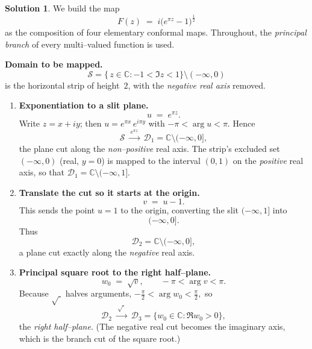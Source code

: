 \documentclass[12pt]{article}
\theoremstyle{definition} %
\newtheorem{solution}{Solution}
\theoremstyle{plain} %
\begin{document}
    \begin{solution}
      We build the map  
      \[
      F(z)\;=\;i\bigl(e^{\pi z}-1\bigr)^{\tfrac12}
      \]
      as the composition of four elementary conformal maps.  Throughout,
      the \emph{principal branch} of every multi–valued function is used.
      
      \medskip
      \textbf{Domain to be mapped.}
      \[
      \boxed{
         \mathcal S
         =\bigl\{\,z\in\mathbb{C} : -1<\Im z<1\bigr\}
          \setminus (-\infty,0)
       }
      \]
      is the horizontal strip of height~$2$, with the \emph{negative real
      axis} removed.
      
      \medskip
      \begin{enumerate}[label=\textbf{Step \arabic*:}, itemsep=1.4ex]
      
      \item  \textbf{Exponentiation to a slit plane.}  
      \[
      u \;=\; e^{\pi z}.
      \]
      Write $z=x+iy$; then  
      $u=e^{\pi x}\,e^{i\pi y}$ with
      \(
      -\pi<\arg u<\pi.
      \)
      Hence
      \[
      \mathcal S
      \;\xrightarrow{\,e^{\pi z}\,}\;
      \mathcal D_1
        = \mathbb{C}\setminus(-\infty,0],
      \]
      the plane cut along the \emph{non–positive} real axis.  
      The strip’s excluded set $(-\infty,0)$ (real, $y=0$) is mapped to the
      interval $(0,1)$ on the \emph{positive} real axis, so that
      \(
      \mathcal D_1
      =\mathbb{C}\setminus(-\infty,1].
      \)
      
      \item \textbf{Translate the cut so it starts at the origin.}  
      \[
      v \;=\; u-1.
      \]
      This sends the point $u=1$ to the origin, converting the slit
      $(-\infty,1]$ into
      \[
      (-\infty,0].
      \]
      Thus
      \[
      \mathcal D_2
        = \mathbb{C}\setminus(-\infty,0],
      \]
      a plane cut exactly along the \emph{negative} real axis.
      
      \item \textbf{Principal square root to the right half–plane.}  
      \[
      w_0 \;=\; \sqrt{v},
      \qquad
      -\pi<\arg v<\pi.
      \]
      Because $\sqrt{\;}$ halves arguments,
      \(
      -\tfrac{\pi}{2}<\arg w_0<\tfrac{\pi}{2},
      \)
      so
      \[
      \mathcal D_2
      \;\xrightarrow{\,\sqrt{\;}\,}\;
      \mathcal D_3
        = \{w_0\in\mathbb{C} : \Re w_0>0\},
      \]
      the \emph{right half–plane}.  
      (The negative real cut becomes the imaginary axis,
      which is the branch cut of the square root.)
      

\end{enumerate}
\end{solution}
\end{document}
